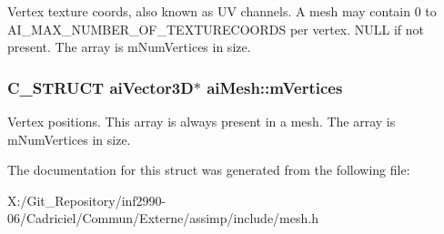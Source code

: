 Vertex texture coords, also known as U\-V channels. A mesh may contain 0 to A\-I\-\_\-\-M\-A\-X\-\_\-\-N\-U\-M\-B\-E\-R\-\_\-\-O\-F\-\_\-\-T\-E\-X\-T\-U\-R\-E\-C\-O\-O\-R\-D\-S per vertex. N\-U\-L\-L if not present. The array is m\-Num\-Vertices in size. \hypertarget{structai_mesh_afd4588abb3e1c72821ae0234a3850662}{
\subsubsection[{m\-Vertices}]{\setlength{\rightskip}{0pt plus 5cm}C\-\_\-\-S\-T\-R\-U\-C\-T {\bf ai\-Vector3\-D}$\ast$ ai\-Mesh\-::m\-Vertices}}\label{structai_mesh_afd4588abb3e1c72821ae0234a3850662}
Vertex positions. This array is always present in a mesh. The array is m\-Num\-Vertices in size. 

The documentation for this struct was generated from the following file\-:\begin{DoxyCompactItemize}
\item 
X\-:/\-Git\-\_\-\-Repository/inf2990-\/06/\-Cadriciel/\-Commun/\-Externe/assimp/include/mesh.\-h\end{DoxyCompactItemize}
